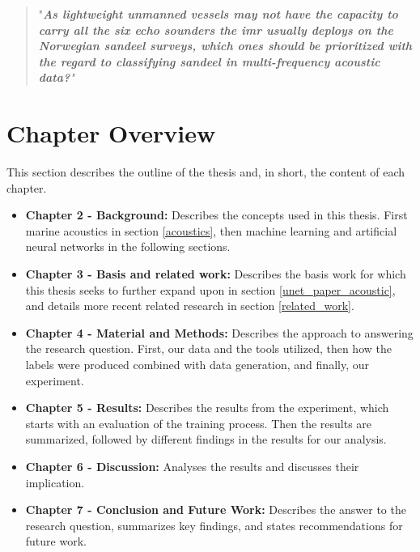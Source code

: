         \begin{quote}
        "\textit{\textbf{As lightweight unmanned vessels may not have the capacity to carry all the six echo sounders the \gls{imr} usually deploys on the Norwegian sandeel surveys, which ones should be prioritized with the regard to classifying sandeel in multi-frequency acoustic data?}"}
        \end{quote}
        



\section{Chapter Overview}
    This section describes the outline of the thesis and, in short, the content of each chapter.
    \begin{itemize}
        \item \textbf{Chapter 2 - Background: } Describes the concepts used in this thesis. First marine acoustics in section \ref{acoustics}, then machine learning and artificial neural networks in the following sections.
        \item \textbf{Chapter 3 - Basis and related work:} Describes the basis work for which this thesis seeks to further expand upon in section \ref{unet_paper_acoustic}, and details more recent related research in section \ref{related_work}.
        \item \textbf{Chapter 4 - Material and Methods:} Describes the approach to answering the research question. First, our data and the tools utilized, then how the labels were produced combined with data generation, and finally, our experiment.
        \item \textbf{Chapter 5 - Results:} Describes the results from the experiment, which starts with an evaluation of the training process. Then the results are summarized, followed by different findings in the results for our analysis. 
        \item \textbf{Chapter 6 - Discussion:}  Analyses the results and discusses their implication. 
        \item \textbf{Chapter 7 - Conclusion and Future Work:}  Describes the answer to the research question, summarizes key findings, and states recommendations for future work.
    \end{itemize}


